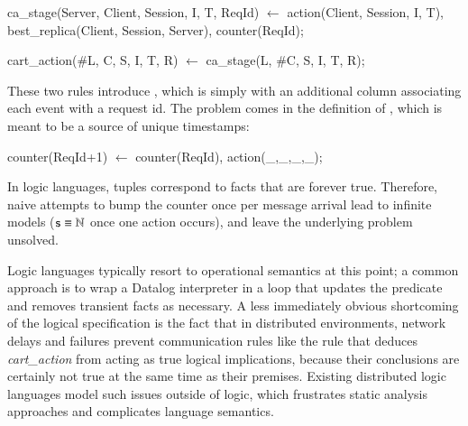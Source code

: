 \begin{Dedalus}
ca_stage(Server, Client, Session, I, T, ReqId) \(\leftarrow\)
  action(Client, Session, I, T),
  best_replica(Client, Session, Server),
  counter(ReqId);

cart_action(#L, C, S, I, T, R) \(\leftarrow\)
  ca_stage(L, #C, S, I, T, R);
\end{Dedalus}

These two rules introduce , which is simply
 with an additional column associating each event with
a request id.  The problem comes in the definition of
, which is meant to be a source of unique timestamps:

\begin{Dedalus}
counter(ReqId+1) \(\leftarrow\) counter(ReqId),
                    action(_,_,_,_);
\end{Dedalus}

In logic languages, tuples correspond to facts that are forever true.
Therefore, naive attempts to bump the counter once per message arrival
lead to infinite models ($\dedalus{s} \equiv \mathbb{N}$ once one
action occurs), and leave the underlying problem unsolved.

Logic languages typically resort to operational semantics
at this point; a common approach is to wrap a Datalog interpreter in
a  loop that updates the 
predicate and removes transient facts as necessary.
A less immediately obvious shortcoming of the logical specification is the 
fact that in distributed environments, network delays
and failures prevent communication rules like the rule that deduces {\em cart\_action}
from acting as true logical
implications, because their conclusions are certainly not true at the same time
as their premises.
Existing distributed logic languages model such issues
outside of logic, which frustrates static analysis approaches and
complicates language semantics.  



